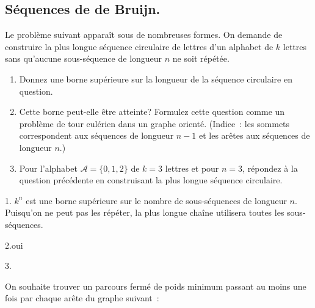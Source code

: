 \subsection{Séquences de de Bruijn.} Le problème suivant apparaît sous de nombreuses formes. On demande de construire la plus longue séquence circulaire de lettres d'un alphabet de $k$ lettres sans qu'aucune sous-séquence de longueur $n$ ne soit répétée.
\begin{enumerate}
  \item Donnez une borne supérieure sur la longueur de la séquence circulaire en question.
  \item Cette borne peut-elle être atteinte? Formulez cette question comme un problème de tour eulérien dans un graphe orienté. (Indice~: les sommets correspondent aux séquences de longueur $n-1$ et les arêtes aux séquences de longueur $n$.)
  \item Pour l'alphabet $\mathcal{A} = \{0, 1, 2\}$ de $k = 3$ lettres et pour $n = 3$, répondez à la question précédente en construisant la plus longue séquence circulaire.
\end{enumerate}
\begin{solution}
1. $k^{n}$ est une borne supérieure sur le nombre de sous-séquences
de longueur $n$. Puisqu'on ne peut pas les répéter, la plus longue
chaîne utilisera toutes les sous-séquences.

2.oui

3.
\end{solution}
\pagebreak
{} On souhaite trouver un parcours fermé de poids minimum passant au moins une fois par chaque arête du graphe suivant~:
